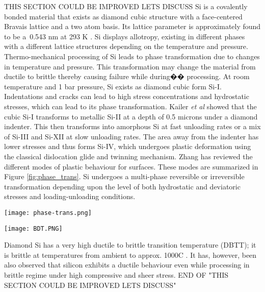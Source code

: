 THIS SECTION COULD BE IMPROVED LETS DISCUSS
\newline
Si is a covalently bonded material that exists as diamond cubic structure with a face-centered Bravais lattice and a two atom basis. Its lattice parameter is approximately found to be a~0.543 nm at 293 K \cite{hull1999properties}. Si displays allotropy, existing in different phases with a different lattice structures depending on the temperature and pressure. Thermo-mechanical processing of Si leads to phase transformation due to changes in temperature and pressure. This transformation may change the material from ductile to brittle thereby causing failure while during�� processing. At room temperature and 1 bar pressure, Si exists as diamond cubic form Si-I. Indentations and cracks can lead to high stress concentrations and hydrostatic stresses, which can lead to its phase transformation.  Kailer \textit{et al} \cite{kailer1997phase} showed that the cubic Si-I transforms to metallic Si-II at a depth of 0.5 microns under a diamond indenter. This then transforms into amorphous Si at fast unloading rates or a mix of Si-III and Si-XII at slow unloading rates. The area away from the indenter has lower stresses and thus forms Si-IV, which undergoes plastic deformation using the classical dislocation glide and twinning mechanism. Zhang \cite{zhang2004plasticity} has reviewed the different modes of plastic behaviour for surfaces. These modes are summarized in Figure \ref{fig:phase_trans}. Si undergoes a multi-phase reversible or irreversible transformation depending upon the level of both hydrostatic and deviatoric stresses and loading-unloading conditions. 

\noindent
\begin{minipage}[c]{\textwidth}
\centering
        \captionsetup{type=figure}
        \texttt{[image: phase-trans.png]}
        \label{fig:phase_trans}
 \end{minipage}

\noindent
\begin{minipage}[c]{\textwidth}
\centering
        \captionsetup{type=figure}
        \texttt{[image: BDT.PNG]}
        \label{fig:bdt}
 \end{minipage}

Diamond Si has a very high ductile to brittle transition temperature (DBTT); it is brittle at temperatures from ambient to approx. 1000\degree C \cite{brede1993brittle}. It has, however, been also observed that silicon exhibits a ductile behaviour even while processing in brittle regime \cite{liu2007mechanism} under high compressive and sheer stress.
\newline
END OF "THIS SECTION COULD BE IMPROVED LETS DISCUSS"

